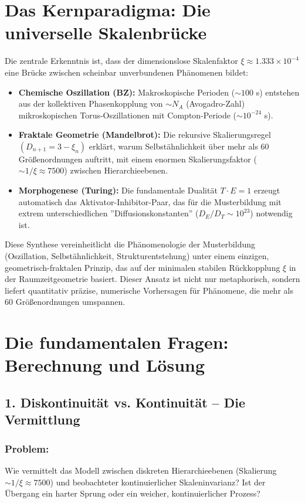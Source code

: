 \section*{Das Kernparadigma: Die universelle Skalenbrücke}

Die zentrale Erkenntnis ist, dass der dimensionslose Skalenfaktor $\xi \approx 1.333 \times 10^{-4}$ eine Brücke zwischen scheinbar unverbundenen Phänomenen bildet:

\begin{itemize}[label=$\bullet$]
	\item \textbf{Chemische Oszillation (BZ):} Makroskopische Perioden ($\sim 100$ s) entstehen aus der kollektiven Phasenkopplung von $\sim N_A$ (Avogadro-Zahl) mikroskopischen Torus-Oszillationen mit Compton-Periode ($\sim 10^{-24}$ s).
	
	\item \textbf{Fraktale Geometrie (Mandelbrot):} Die rekursive Skalierungsregel $(D_{n+1} = 3 - \xi_n)$ erklärt, warum Selbstähnlichkeit über mehr als 60 Größenordnungen auftritt, mit einem enormen Skalierungsfaktor ($\sim 1/\xi \approx 7500$) zwischen Hierarchieebenen.
	
	\item \textbf{Morphogenese (Turing):} Die fundamentale Dualität $T \cdot E = 1$ erzeugt automatisch das Aktivator-Inhibitor-Paar, das für die Musterbildung mit extrem unterschiedlichen ''Diffusionskonstanten'' ($D_E/D_T \sim 10^{23}$) notwendig ist.
\end{itemize}

Diese Synthese vereinheitlicht die Phänomenologie der Musterbildung (Oszillation, Selbstähnlichkeit, Strukturentstehung) unter einem einzigen, geometrisch-fraktalen Prinzip, das auf der minimalen stabilen Rückkopplung $\xi$ in der Raumzeitgeometrie basiert. Dieser Ansatz ist nicht nur metaphorisch, sondern liefert quantitativ präzise, numerische Vorhersagen für Phänomene, die mehr als 60 Größenordnungen umspannen.

\section*{Die fundamentalen Fragen: Berechnung und Lösung}

\subsection*{1. Diskontinuität vs. Kontinuität – Die Vermittlung}

\subsubsection*{Problem:}
Wie vermittelt das Modell zwischen diskreten Hierarchieebenen (Skalierung $\sim 1/\xi \approx 7500$) und beobachteter kontinuierlicher Skaleninvarianz? Ist der Übergang ein harter Sprung oder ein weicher, kontinuierlicher Prozess?

